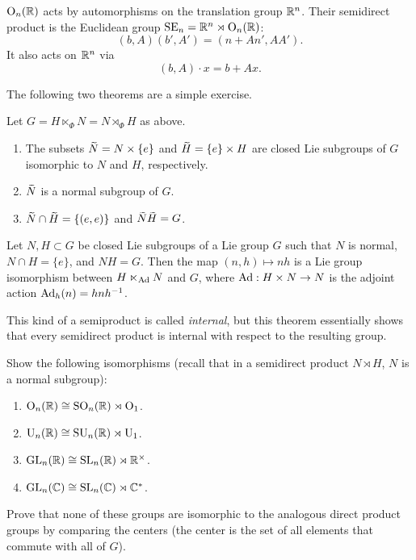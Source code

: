 \begin{example}
    $\operatorname{O}_n(\mathbb{R})$ acts by automorphisms on the translation group $\mathbb{R}^n$. Their semidirect product is the Euclidean group $\operatorname{SE}_n=\mathbb{R}^n\rtimes \operatorname{O}_n(\mathbb{R})$:
    \[(b,A)(b',A')=(n+An',AA').\]
    It also acts on $\mathbb{R}^n$ via 
    \[(b,A)\cdot x=b+Ax.\]
\end{example}


The following two theorems are a simple exercise.
\begin{prop}
    Let $G=H\ltimes_\Phi N=N\rtimes_\Phi H$ as above.
    \begin{enumerate}[label=(\alph*)]
        \item The subsets $\wt{N}=N\times\{e\}$ and $\wt{H}=\{e\}\times H$ are closed Lie subgroups of $G$ isomorphic to $N$ and $H$, respectively.
        \item $\wt N$ is a normal subgroup of $G$.
        \item $\wt N\cap \wt H=\{(e,e)\}$ and $\wt{N}\wt{H}=G$.
    \end{enumerate}
\end{prop}

\begin{thm}
    Let $N,H\subset G$ be closed Lie subgroups of a Lie group $G$ such that $N$ is normal, $N\cap H=\{e\}$, and $NH=G$. Then the map $(n,h)\mapsto nh$ is a Lie group isomorphism between $H\ltimes_{\mathrm{Ad}} N$ and $G$, where $\mathrm{Ad}:H\times N\to N$ is the adjoint action $\mathrm{Ad}_h(n)=hnh^{-1}$.
\end{thm}
This kind of a semiproduct is called \emph{internal}, but this theorem essentially shows that every semidirect product is internal with respect to the resulting group.

\begin{xca}
    Show the following isomorphisms (recall that in a semidirect product $N\rtimes H$, $N$ is a normal subgroup):
    \begin{enumerate}[label=(\alph*)]
        \item $\operatorname{O}_n(\mathbb{R})\cong \operatorname{SO}_n(\mathbb{R})\rtimes \operatorname{O}_1$.
        \item $\operatorname{U}_n(\mathbb{R})\cong \operatorname{SU}_n(\mathbb{R})\rtimes \operatorname{U}_1$.
        \item $\operatorname{GL}_n(\mathbb{R})\cong \operatorname{SL}_n(\mathbb{R})\rtimes \mathbb{R}^\times$.
        \item $\operatorname{GL}_n(\mathbb{C})\cong \operatorname{SL}_n(\mathbb{C})\rtimes \mathbb{C}^\ast$.
    \end{enumerate}
    Prove that none of these groups are isomorphic to the analogous direct product groups by comparing the centers (the center is the set of all elements that commute with all of $G$).
\end{xca}






